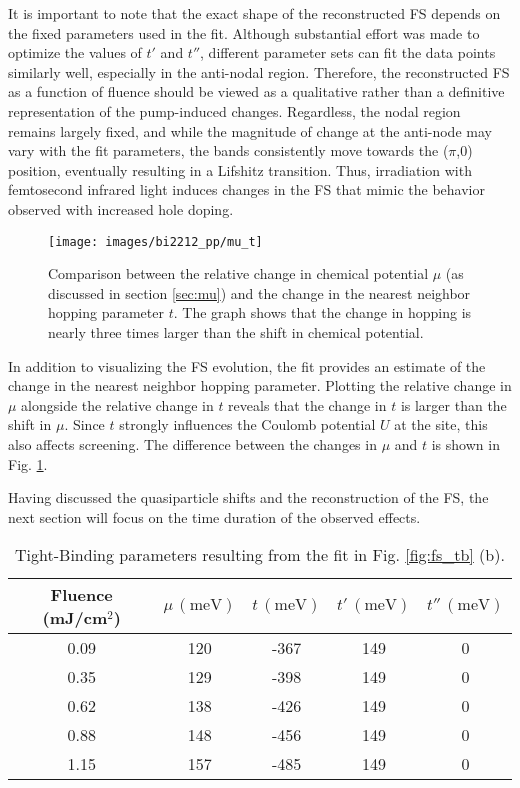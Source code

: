 It is important to note that the exact shape of the reconstructed FS depends on the fixed parameters used in the fit.
Although substantial effort was made to optimize the values of $t'$ and $t''$, different parameter sets can fit the data points similarly well, especially in the anti-nodal region.
Therefore, the reconstructed FS as a function of fluence should be viewed as a qualitative rather than a definitive representation of the pump-induced changes.
Regardless, the nodal region remains largely fixed, and while the magnitude of change at the anti-node may vary with the fit parameters, the bands consistently move towards the ($\pi$,$0$) position, eventually resulting in a Lifshitz transition.
Thus, irradiation with femtosecond infrared light induces changes in the FS that mimic the behavior observed with increased hole doping.

\begin{figure}
	\centering
	\texttt{[image: images/bi2212\_pp/mu\_t]}
	\caption{Comparison between the relative change in chemical potential $\mu$ (as discussed in section \ref{sec:mu}) and the change in the nearest neighbor hopping parameter $t$. The graph shows that the change in hopping is nearly three times larger than the shift in chemical potential.}
	\label{fig:mu_t}
\end{figure}

In addition to visualizing the FS evolution, the fit provides an estimate of the change in the nearest neighbor hopping parameter.
Plotting the relative change in $\mu$ alongside the relative change in $t$ reveals that the change in $t$ is larger than the shift in $\mu$.
Since $t$ strongly influences the Coulomb potential $U$ at the  site, this also affects screening.
The difference between the changes in $\mu$ and $t$ is shown in Fig. \ref{fig:mu_t}.

Having discussed the quasiparticle shifts and the reconstruction of the FS, the next section will focus on the time duration of the observed effects.

\begin{table}[h!]
	\centering
	\begin{tabular}{ccccc}
		\toprule[1pt]\midrule[0.3pt]
		Fluence (mJ/cm\(^2\)) & \(\mu \, (\text{meV})\) & \(t \, (\text{meV})\) & \(t' \, (\text{meV})\) & \(t'' \, (\text{meV})\) \\ 
		\midrule
		0.09 & 120 & -367 & 149 & 0 \\ 
		0.35 & 129 & -398 & 149 & 0 \\ 
		0.62 & 138 & -426 & 149 & 0 \\ 
		0.88 & 148 & -456 & 149 & 0 \\ 
		1.15 & 157 & -485 & 149 & 0 \\ 
		\midrule[0.3pt]\bottomrule[1pt]
	\end{tabular}
	\caption{Tight-Binding parameters resulting from the fit in Fig. \ref{fig:fs_tb} (b).}
	\label{tab:tb}
\end{table}


